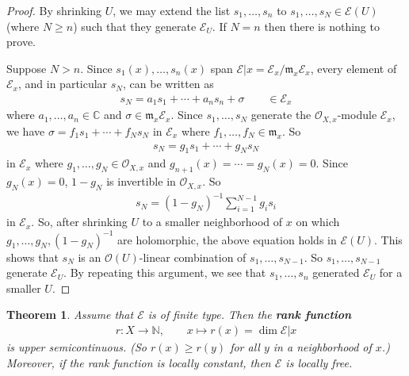 \documentclass[12pt,a4paper,notitlepage]{article}
\theoremstyle{definition}
\theoremstyle{plain}
\newtheorem{thm}[df]{Theorem}
\newcommand{\fk}{\mathfrak}
\newcommand{\scr}{\mathscr}
\newcommand{\Cbb}{\mathbb C}
\newcommand{\Nbb}{\mathbb N}
\numberwithin{equation}{section}
\begin{document}
\begin{proof}
By shrinking $U$, we may extend the list $s_1,\dots,s_n$ to $s_1,\dots,s_N\in\scr E(U)$ (where $N\geq n$) such that they generate $\scr E_U$. If $N=n$ then there is nothing to prove. 

Suppose $N>n$. Since $s_1(x),\dots,s_n(x)$ span $\scr E|x=\scr E_x/\fk m_x\scr E_x$, every element of $\scr E_x$, and in particular $s_N$, can be written as 
\begin{align*}
s_N=a_1s_1+\cdots+a_ns_n+\sigma\qquad \in\scr E_x
\end{align*}
where $a_1,\dots,a_n\in\Cbb$ and $\sigma\in\fk m_x\scr E_x$. Since $s_1,\dots,s_N$ generate the $\scr O_{X,x}$-module $\scr E_x$, we have $\sigma=f_1s_1+\cdots+f_Ns_N$ in $\scr E_x$ where $f_1,\dots,f_N\in\fk m_x$. So
\begin{align*}
s_N=g_1s_1+\cdots+g_Ns_N
\end{align*} 
in $\scr E_x$ where $g_1,\dots,g_N\in\scr O_{X,x}$ and $g_{n+1}(x)=\cdots=g_N(x)=0$. Since $g_N(x)=0$, $1-g_N$ is invertible in $\scr O_{X,x}$. So
\begin{align*}
s_N=(1-g_N)^{-1}\sum_{i=1}^{N-1}g_is_i
\end{align*}
in $\scr E_x$. So, after shrinking $U$ to a smaller neighborhood of $x$  on which $g_1,\dots,g_N,(1-g_N)^{-1}$ are holomorphic, the above equation holds in  $\scr E(U)$. This shows that $s_N$ is an $\scr O(U)$-linear combination of $s_1,\dots,s_{N-1}$. So $s_1,\dots,s_{N-1}$ generate $\scr E_U$. By repeating this argument, we see that $s_1,\dots,s_n$ generated $\scr E_U$ for a smaller $U$.
\end{proof}


\begin{thm}\label{lba1}
Assume that $\scr E$ is of finite type. Then the \textbf{rank function}
\begin{align}
r:X\rightarrow\Nbb,\qquad x\mapsto r(x)=\dim\scr E|x
\end{align}
is upper semicontinuous. (So $r(x)\geq r(y)$ for all $y$ in a neighborhood of $x$.)  Moreover, if the rank function is locally constant, then $\scr E$ is locally free.
\end{thm}
\end{document}
